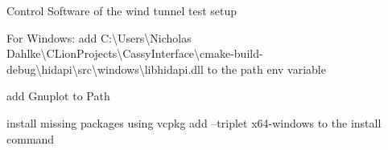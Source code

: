 Control Software of the wind tunnel test setup

For Windows\+: add C\+:\textbackslash{}\+Users\textbackslash{}\+Nicholas Dahlke\textbackslash{}\+CLion\+Projects\textbackslash{}\+Cassy\+Interface\textbackslash{}cmake-\/build-\/debug\textbackslash{}hidapi\textbackslash{}src\textbackslash{}windows\textbackslash{}libhidapi.\+dll to the path env variable

add Gnuplot to Path

install missing packages using vcpkg add --triplet x64-\/windows to the install command 